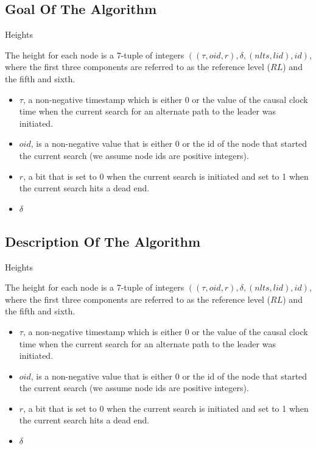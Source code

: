 \documentclass{beamer}
\begin{document}
\subsection{Goal Of The Algorithm}
\begin{frame}{Heights}

The height for each node is a 7-tuple of integers $((\tau , oid, r), \delta, (nlts, lid), id)$, where the first three components are referred to as the reference level ($RL$) and the fifth and sixth.

\begin{itemize}
	\item $\tau$, a non-negative timestamp which is either 0 or the value of the causal clock time when the current search for an alternate path to the leader was initiated.
	\item $oid$, is a non-negative value that is either 0 or the id of the node that started the current search (we assume node ids are positive integers).
	\item $r$, a bit that is set to 0 when the current search is initiated and set to 1 when the current search hits a dead end.
	\item $\delta$


\end{itemize}

\end{frame}
\subsection{Description Of The Algorithm}
\begin{frame}{Heights}

The height for each node is a 7-tuple of integers $((\tau , oid, r), \delta, (nlts, lid), id)$, where the first three components are referred to as the reference level ($RL$) and the fifth and sixth.

\begin{itemize}
	\item $\tau$, a non-negative timestamp which is either 0 or the value of the causal clock time when the current search for an alternate path to the leader was initiated.
	\item $oid$, is a non-negative value that is either 0 or the id of the node that started the current search (we assume node ids are positive integers).
	\item $r$, a bit that is set to 0 when the current search is initiated and set to 1 when the current search hits a dead end.
	\item $\delta$

\end{itemize}

\end{frame}
\end{document}
